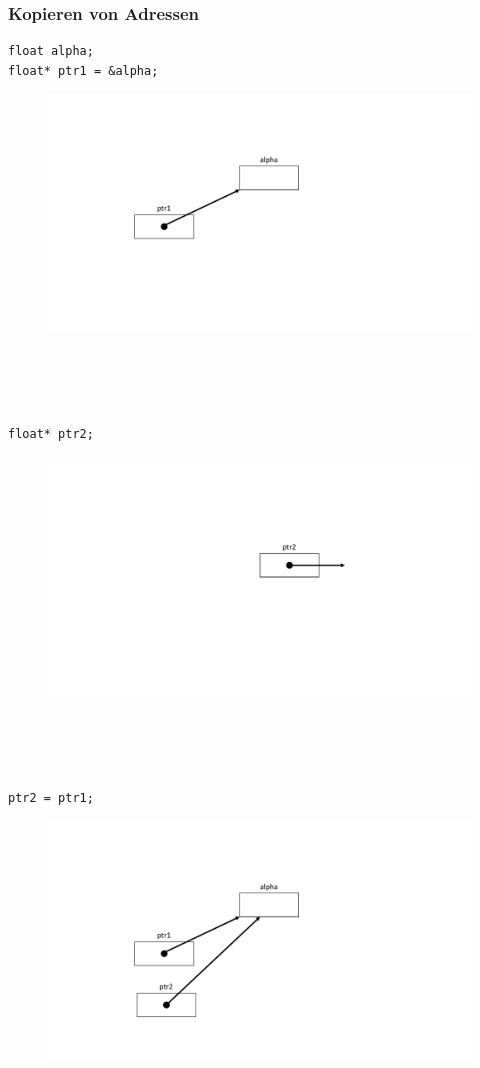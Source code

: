 \subsubsection{Kopieren von Adressen}
\label{sec:Kopieren von Adressen}
\noindent
\begin{minipage}{\linewidth}
\begin{lstlisting}
float alpha;
float* ptr1 = &alpha;
\end{lstlisting}
\end{minipage}
\begin{figure}[h!]
	\centering
	\includegraphics[width=0.4\linewidth]{images/pointer4.pdf}
\end{figure}
\\ \\ \\
\noindent
\begin{minipage}{\linewidth}
\begin{lstlisting}
float* ptr2;
\end{lstlisting}
\end{minipage}
\begin{figure}[h!]
	\centering
	\includegraphics[width=0.2\linewidth]{images/pointer5.pdf}
\end{figure}
\\ \\ \\
\noindent
\begin{minipage}{\linewidth}
\begin{lstlisting}
ptr2 = ptr1;
\end{lstlisting}
\end{minipage}
\begin{figure}[h!]
	\centering
	\includegraphics[width=0.4\linewidth]{images/pointer6.pdf}
\end{figure}
\\ \\ \\

